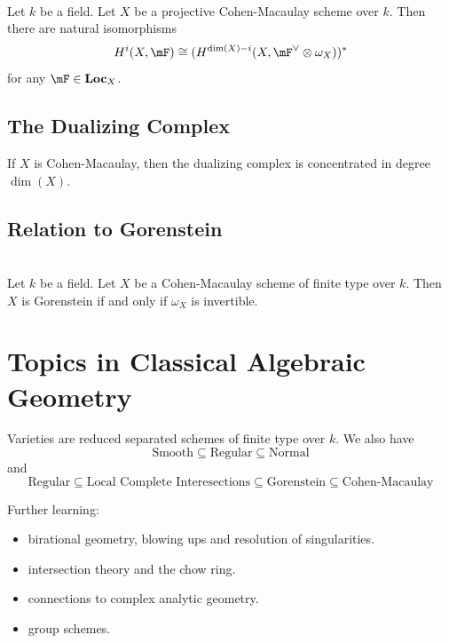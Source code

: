 \documentclass[a4paper]{article}
\begin{document}
\begin{crl}{}{}\\
Let $k$ be a field. Let $X$ be a projective Cohen-Macaulay scheme over $k$. Then there are natural isomorphisms $$H^i(X,\mF)\cong(H^{\dim(X)-i}(X,\mF^\vee\otimes\omega_X))^\ast$$ for any $\mF\in\bold{Loc}_X$. 
\end{crl}

\subsection{The Dualizing Complex}

If $X$ is Cohen-Macaulay, then the dualizing complex is concentrated in degree $\dim(X)$. 

\subsection{Relation to Gorenstein}
\begin{prp}{}{}\\
Let $k$ be a field. Let $X$ be a Cohen-Macaulay scheme of finite type over $k$. Then $X$ is Gorenstein if and only if $\omega_X$ is invertible. 
\end{prp}

\pagebreak
\section{Topics in Classical Algebraic Geometry}
Varieties are reduced separated schemes of finite type over $k$. We also have $$\text{Smooth}\subseteq\text{Regular}\subseteq\text{Normal}$$ and $$\text{Regular}\subseteq\text{Local Complete Interesections}\subseteq\text{Gorenstein}\subseteq\text{Cohen-Macaulay}$$

Further learning:
\begin{itemize}
\item birational geometry, blowing ups and resolution of singularities. 
\item intersection theory and the chow ring. 
\item connections to complex analytic geometry. 
\item group schemes. 
\end{itemize}
\end{document}
